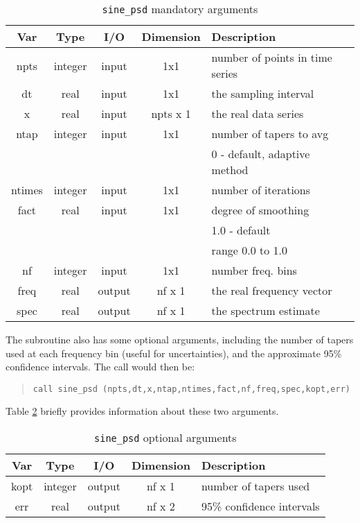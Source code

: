 \documentclass{article}
\begin{document}
\begin{table}[htdp]
\caption{\texttt{sine\_psd} mandatory arguments}
\begin{center}
\begin{tabular}{|c|c|c|c|l|}
\hline
\textbf{Var} &	\textbf{Type}	&  \textbf{I/O}	&	\textbf{Dimension}	&	\textbf{Description}		\\
\hline	\hline
npts		& 	integer	& input &	1x1				&	number of points in time series 		\\
dt		&	real		& input &	1x1				&	the sampling interval				\\
x		&	real		& input &	npts x 1			&	the real data series				\\
ntap		&	integer	& input &	1x1				&	number of tapers to avg		\\
		&		&  &					&	0 - default, adaptive method		\\
ntimes	&	integer	& input &	1x1				&	number of iterations		\\
fact	&	real	& input &	1x1				&	degree of smoothing	\\
&		& &					& 	1.0 - default	\\
&		& &					&	range 0.0 to 1.0	\\
nf		&	integer	& input &	1x1				&	number freq. bins		\\
freq		&	real		& output &	nf x 1			&	the real frequency vector			\\
spec		&	real		& output &	nf x 1			&	the spectrum estimate			\\
\hline
\end{tabular}
\end{center}
\label{tab:sine_arg}
\end{table}%

The subroutine also has some optional arguments, including the number of tapers used at each frequency bin (useful for uncertainties), and the approximate 95\% confidence intervals. The call would then be: 
\begin{quote}
\begin{verbatim}
call sine_psd (npts,dt,x,ntap,ntimes,fact,nf,freq,spec,kopt,err)
\end{verbatim}
\end{quote}
Table  \ref{tab:sine_opt} briefly provides information about these two arguments.

\begin{table}[htdp]
\caption{\texttt{sine\_psd} optional arguments}
\begin{center}
\begin{tabular}{|c|c|c|c|l|}
\hline
\textbf{Var} &	\textbf{Type}	&  \textbf{I/O}	&	\textbf{Dimension}	&	\textbf{Description}		\\
\hline	\hline
kopt	&	integer		& output &	nf x 1			&	number of tapers used			\\
err		&	real		& output &	nf x 2			&	95\% confidence intervals			\\
\hline
\end{tabular}
\end{center}
\label{tab:sine_opt}
\end{table}%
\end{document}
